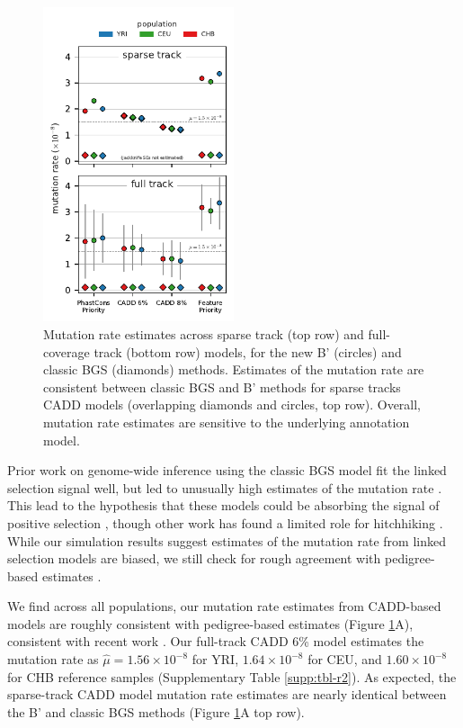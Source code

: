 \documentclass[11pt]{article}
\begin{document}
\begin{figure}[htbp] 
    \centering
    \includegraphics[width=0.5\textwidth]{figures/figure_5.pdf} 
    
    \caption{Mutation rate estimates across sparse track (top row) and
        full-coverage track (bottom row) models, for the new B' (circles) and
        classic BGS (diamonds) methods. Estimates of the mutation rate are
        consistent between classic BGS and B' methods for sparse tracks CADD
        models (overlapping diamonds and circles, top row). Overall, mutation
        rate estimates are sensitive to the underlying annotation model.}
  \label{fig:figure-4}
\end{figure}

Prior work on genome-wide inference using the classic BGS model fit the linked
selection signal well, but led to unusually high estimates of the mutation rate
\parencite{McVicker2009-ax}. This lead to the hypothesis that these models
could be absorbing the signal of positive selection \parencite{Enard2014-kz},
though other work has found a limited role for hitchhiking
\parencite{Pickrell2009-tt,Hernandez2011-gs,Murphy2022}. While our simulation
results suggest estimates of the mutation rate from linked selection models are
biased, we still check for rough agreement with pedigree-based estimates
\parencite{Kong2013-fc,Tian2019-so}. 

We find across all populations, our mutation rate estimates from CADD-based
models are roughly consistent with pedigree-based estimates (Figure
\ref{fig:figure-4}A), consistent with recent work \parencite{Murphy2022-sj}.
Our full-track CADD 6\% model estimates the mutation rate as $\widehat{\mu} =
1.56 \times 10^{-8}$ for YRI, $1.64 \times 10^{-8}$ for CEU, and $1.60 \times
10^{-8}$ for CHB reference samples (Supplementary Table \ref{supp:tbl-r2}). As
expected, the sparse-track CADD model mutation rate estimates are nearly
identical between the B' and classic BGS methods (Figure \ref{fig:figure-4}A
top row).
\end{document}
